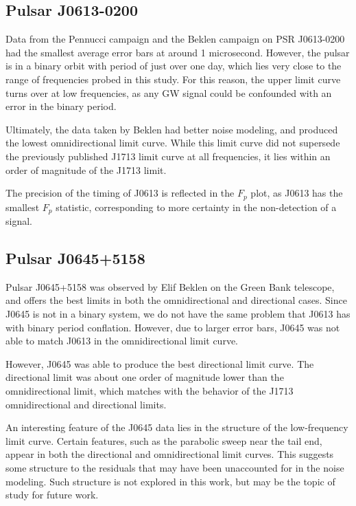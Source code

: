 \documentclass[12pt]{article}
\begin{document}
\subsection{Pulsar J0613-0200}

Data from the Pennucci campaign and the Beklen campaign on PSR J0613-0200 had the
smallest average error bars at around 1 microsecond. However, the pulsar is in a
binary orbit with period of just over one day, which lies very close to the
range of frequencies probed in this study. For this reason, the upper limit
curve turns over at low frequencies, as any GW signal could be confounded with
an error in the binary period.

Ultimately, the data taken by Beklen had better noise modeling, and produced the
lowest omnidirectional limit curve. While this limit curve did not supersede the
previously published J1713 limit curve at all frequencies, it lies within an
order of magnitude of the J1713 limit.

The precision of the timing of J0613 is reflected in the $F_p$ plot, as J0613
has the smallest $F_p$ statistic, corresponding to more certainty in the
non-detection of a signal.

\subsection{Pulsar J0645+5158}

Pulsar J0645+5158 was observed by Elif Beklen on the Green Bank telescope, and
offers the best limits in both the omnidirectional and directional cases. Since
J0645 is not in a binary system, we do not have the same problem that J0613 has
with binary period conflation. However, due to larger error bars, J0645 was not
able to match J0613 in the omnidirectional limit curve.

However, J0645 was able to produce the best directional limit curve. The
directional limit was about one order of magnitude lower than the
omnidirectional limit, which matches with the behavior of the J1713
omnidirectional and directional limits. 

An interesting feature of the J0645 data lies in the structure of the
low-frequency limit curve. Certain features, such as the parabolic sweep near
the tail end, appear in both the directional and omnidirectional limit curves.
This suggests some structure to the residuals that may have been unaccounted for
in the noise modeling. Such structure is not explored in this work, but may be
the topic of study for future work.
\end{document}
